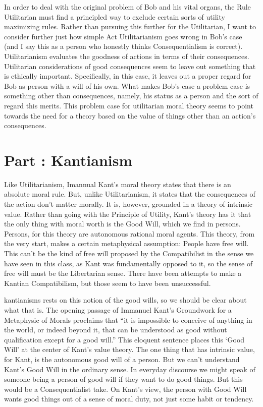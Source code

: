 In order to deal with the original problem of Bob and his vital organs, the Rule Utilitarian must find a principled way to exclude certain sorts of utility maximizing rules. Rather than pursuing this further for the Utilitarian, I want to consider further just how simple Act Utilitarianism goes wrong in Bob’s case (and I say this as a person who honestly thinks Consequentialism is correct). Utilitarianism evaluates the goodness of actions in terms of their consequences. Utilitarian considerations of good consequences seem to leave out something that is ethically important. Specifically, in this case, it leaves out a proper regard for Bob as person with a will of his own. What makes Bob’s case a problem case is something other than consequences, namely, his status as a person and the sort of regard this merits. This problem case for utilitarian moral theory seems to point towards the need for a theory based on the value of things other than an action’s consequences.
\chapter{Part \thechapcount: Kantianism}\setcounter{seccount}{1}

Like Utilitarianism, Imannual Kant’s moral theory states that there is an absolute moral rule. But, unlike Utilitarianism, it states that the consequences of the action don't matter morally. It is, however, grounded in a theory of intrinsic value. Rather than going with the Principle of Utility, Kant's theory has it that the only thing with moral worth is the Good Will, which we find in persons. Persons, for this theory are  autonomous rational moral agents. This theory, from the very start, makes a certain metaphysical assumption: People have free will. This can't be the kind of free will proposed by the Compatibilist in the sense we have seen in this class, as Kant was fundamentally opposed to it, so the sense of free will must be the Libertarian sense. There have been attempts to make a Kantian Compatibilism, but those seem to have been unsuccessful.

\glspl{kantianism} rests on this notion of the \glspl{good will}, so we should be clear about what that is. The opening passage of Immanuel Kant’s Groundwork for a Metaphysic of Morals proclaims that “it is impossible to conceive of anything in the world, or indeed beyond it, that can be understood as good without qualification except for a good will.” This eloquent sentence places this `Good Will' at the center of Kant's value theory. The one thing that has intrinsic value, for Kant, is the autonomous good will of a person. But we can't understand Kant's Good Will in the ordinary sense. In everyday discourse we might speak of someone being a person of good will if they want to do good things. But this would be a Consequentialist take. On Kant’s view, the person with Good Will wants  good things out of a sense of moral duty, not just some habit or tendency.

